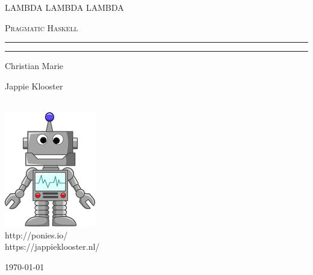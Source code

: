 \makeatletter
\begin{titlepage}
\begin{center}

\vspace*{.06\textheight}
{\scshape\LARGE LAMBDA LAMBDA LAMBDA \par}\vspace{1.5cm} %
\textsc{\Large Pragmatic Haskell}\\[0.5cm] %

\hrule
\vspace{0.2cm}
{\huge \bfseries \@title \par}
\vspace{0.4cm} %
\hrule
\vspace{0.2cm}

\begin{minipage}[t]{0.4\textwidth}
\begin{flushleft} \large
Christian Marie
\end{flushleft}
\end{minipage}
\begin{minipage}[t]{0.4\textwidth}
\begin{flushright} \large
Jappie Klooster
\end{flushright}
\end{minipage}\\[1.5cm]
 
\includegraphics{logo} %
\\[1.0cm]

http://ponies.io/ \\
https://jappieklooster.nl/ \\[2cm] %
 
\vfill

{\large \today}\\[4cm] %
 
\vfill
\end{center}
\end{titlepage}

\renewcommand\listoffigures{%
        \@starttoc{lof}%
}

\renewcommand\listoftables{%
        \@starttoc{lot}%
}
\makeatother
